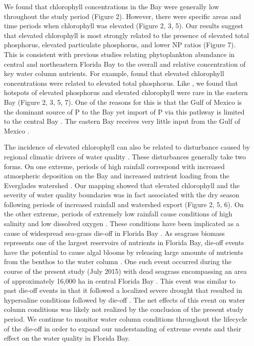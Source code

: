 We found that chlorophyll concentrations in the Bay were generally low throughout the study period (Figure 2). However, there were specific areas and time periods when chlorophyll was elevated (Figure 2, 3, 5). Our results suggest that elevated chlorophyll is most strongly related to the presence of elevated total phosphorus, elevated particulate phosphorus, and lower NP ratios (Figure 7). This is consistent with previous studies relating phytoplankton abundance in central and northeastern Florida Bay to the overall and relative concentration of key water column nutrients. For example, \citet{fourqurean1993process} found that elevated chlorophyll concentrations were related to elevated total phosphorus. Like \citet{fourqurean1993process}, we found that hotspots of elevated phosphorus and elevated chlorophyll were rare in the eastern Bay (Figure 2, 3, 5, 7). One of the reasons for this is that the Gulf of Mexico is the dominant source of P to the Bay yet import of P via this pathway is limited to the central Bay \citep{childers_relating_2006, rudnick1999phosphorus}. The eastern Bay receives very little input from the Gulf of Mexico \citep{lee2016circulation}. 

The incidence of elevated chlorophyll can also be related to disturbance caused by regional climatic drivers of water quality \citep{davis2004importance, briceno_climatic_2009}. These disturbances generally take two forms. On one extreme, periods of high rainfall correspond with increased atmospheric deposition on the Bay and increased nutrient loading from the Everglades watershed \citep{rudnick1999phosphorus,sutula2003factors}. Our mapping showed that elevated chlorophyll and the severity of water quality boundaries was in fact associated with the dry season following periods of increased rainfall and watershed export (Figure 2, 5, 6). On the other extreme, periods of extremely low rainfall cause conditions of high salinity and low dissolved oxygen \citep{hall2016recurrence}. These conditions have been implicated as a cause of widespread sea-grass die-off in Florida Bay \citep{borum2005potential, zieman1999seagrass}. As seagrass biomass represents one of the largest reservoirs of nutrients in Florida Bay, die-off events have the potential to cause algal blooms by releasing large amounts of nutrients from the benthos to the water column \citep{fourqurean2012carbon, zhang2004potential}. One such event occurred during the course of the present study (July 2015) with dead seagrass encompassing an area of approximately 16,000 ha in central Florida Bay \citep{hall2016recurrence}. This event was similar to past die-off events in that it followed a localized severe drought that resulted in hypersaline conditions followed by die-off \citep[Figure 4, ][]{robblee1991mass}. The net effects of this event on water column conditions was likely not realized by the conclusion of the present study period. We continue to monitor water column conditions throughout the lifecycle of the die-off in order to expand our understanding of extreme events and their effect on the water quality in Florida Bay.


